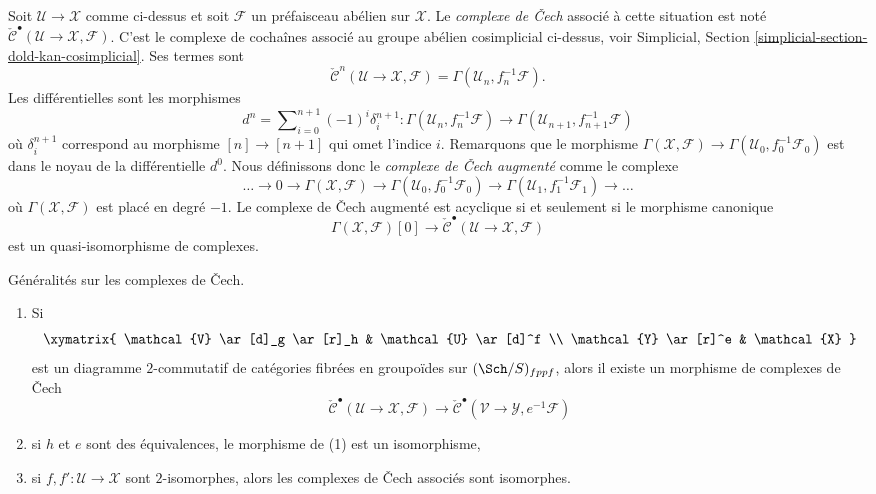 \medskip\noindent
Soit $\mathcal{U} \to \mathcal{X}$ comme ci-dessus et soit $\mathcal{F}$
un préfaisceau abélien sur $\mathcal{X}$.
Le {\it complexe de {\v C}ech} associé à cette situation est noté
$\check{\mathcal{C}}^\bullet(\mathcal{U} \to \mathcal{X}, \mathcal{F})$.
C'est le complexe de cochaînes associé au groupe abélien cosimplicial
ci-dessus, voir
Simplicial, Section \ref{simplicial-section-dold-kan-cosimplicial}.
Ses termes sont
$$
\check{\mathcal{C}}^n(\mathcal{U} \to \mathcal{X}, \mathcal{F})
= \Gamma(\mathcal{U}_n, f_n^{-1}\mathcal{F}).
$$
Les différentielles sont les morphismes
$$
d^n = \sum\nolimits_{i = 0}^{n + 1} (-1)^i \delta^{n + 1}_i :
\Gamma(\mathcal{U}_n, f_n^{-1}\mathcal{F})
\longrightarrow
\Gamma(\mathcal{U}_{n + 1}, f_{n + 1}^{-1}\mathcal{F})
$$
où $\delta^{n + 1}_i$ correspond au morphisme
$[n] \to [n + 1]$ qui omet l'indice $i$. Remarquons que le morphisme
$\Gamma(\mathcal{X}, \mathcal{F}) \to
\Gamma(\mathcal{U}_0, f_0^{-1}\mathcal{F}_0)$
est dans le noyau de la différentielle $d^0$. Nous définissons donc
le {\it complexe de {\v C}ech augmenté} comme le complexe
$$
\ldots \to 0 \to
\Gamma(\mathcal{X}, \mathcal{F}) \to
\Gamma(\mathcal{U}_0, f_0^{-1}\mathcal{F}_0) \to
\Gamma(\mathcal{U}_1, f_1^{-1}\mathcal{F}_1) \to \ldots
$$
où $\Gamma(\mathcal{X}, \mathcal{F})$ est placé en degré $-1$.
Le complexe de {\v C}ech augmenté est acyclique si et seulement si le morphisme canonique
$$
\Gamma(\mathcal{X}, \mathcal{F})[0]
\longrightarrow
\check{\mathcal{C}}^\bullet(\mathcal{U} \to \mathcal{X}, \mathcal{F})
$$
est un quasi-isomorphisme de complexes.

\begin{lemma}
\label{lemma-generalities}
Généralités sur les complexes de {\v C}ech.
\begin{enumerate}
\item Si
$$
\xymatrix{
\mathcal{V} \ar[d]_g \ar[r]_h & \mathcal{U} \ar[d]^f \\
\mathcal{Y} \ar[r]^e & \mathcal{X}
}
$$
est un diagramme $2$-commutatif de catégories fibrées en groupoïdes sur
$(\Sch/S)_{fppf}$, alors il existe un morphisme de complexes de {\v C}ech
$$
\check{\mathcal{C}}^\bullet(\mathcal{U} \to \mathcal{X}, \mathcal{F})
\longrightarrow
\check{\mathcal{C}}^\bullet(\mathcal{V} \to \mathcal{Y}, e^{-1}\mathcal{F})
$$
\item si $h$ et $e$ sont des équivalences, le morphisme de (1) est un isomorphisme,
\item si $f, f' : \mathcal{U} \to \mathcal{X}$ sont $2$-isomorphes, alors
les complexes de {\v C}ech associés sont isomorphes.
\end{enumerate}
\end{lemma}

